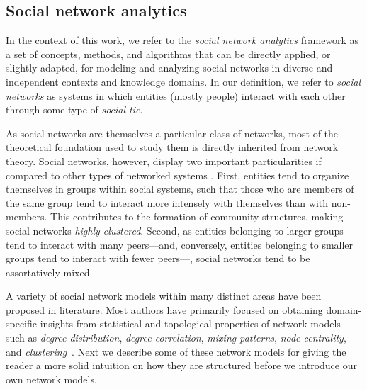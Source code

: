 
\subsection{Social network analytics}
In the context of this work, we refer to the \textit{social network analytics} framework as a set of concepts, methods, and algorithms that can be directly applied, or slightly adapted, for modeling and analyzing social networks in diverse and independent contexts and knowledge domains.
%
In our definition, we refer to \textit{social networks} as systems in which entities (mostly people) interact with each other through some type of \textit{social tie}.

As social networks are themselves a particular class of networks, most of the theoretical foundation used to study them is directly inherited from network theory.
%
Social networks, however, display two important particularities if compared to other types of networked systems \cite{Newman2003d}.
First, entities tend to organize themselves in groups within social systems, such that those who are members of the same group tend to interact more intensely with themselves than with non-members.
This contributes to the formation of community structures, making social networks \textit{highly clustered}.
Second, as entities belonging to larger groups tend to interact with many peers---and, conversely, entities belonging to smaller groups tend to interact with fewer peers---, social networks tend to be assortatively mixed.

A variety of social network models within many distinct areas have been proposed in literature.
Most authors have primarily focused on obtaining domain-specific insights from statistical and topological properties of network models such as \textit{degree distribution}, \textit{degree correlation}, \textit{mixing patterns}, \textit{node centrality}, and \textit{clustering}~\cite{Newman2003b}.
Next we describe some of these network models for giving the reader a more solid intuition on how they are structured before we introduce our own network models.



